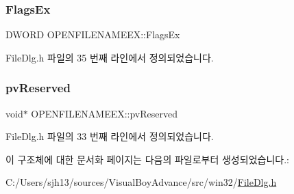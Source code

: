 \subsubsection{\texorpdfstring{Flags\+Ex}{FlagsEx}}
{\footnotesize\ttfamily D\+W\+O\+RD O\+P\+E\+N\+F\+I\+L\+E\+N\+A\+M\+E\+E\+X\+::\+Flags\+Ex}



File\+Dlg.\+h 파일의 35 번째 라인에서 정의되었습니다.

\mbox{\label{struct_o_p_e_n_f_i_l_e_n_a_m_e_e_x_a7a86ce8d401fd1e27346e6ed40ece33a}} 
\subsubsection{\texorpdfstring{pv\+Reserved}{pvReserved}}
{\footnotesize\ttfamily void$\ast$ O\+P\+E\+N\+F\+I\+L\+E\+N\+A\+M\+E\+E\+X\+::pv\+Reserved}



File\+Dlg.\+h 파일의 33 번째 라인에서 정의되었습니다.



이 구조체에 대한 문서화 페이지는 다음의 파일로부터 생성되었습니다.\+:\begin{DoxyCompactItemize}
\item 
C\+:/\+Users/sjh13/sources/\+Visual\+Boy\+Advance/src/win32/\mbox{\hyperlink{_file_dlg_8h}{File\+Dlg.\+h}}\end{DoxyCompactItemize}

